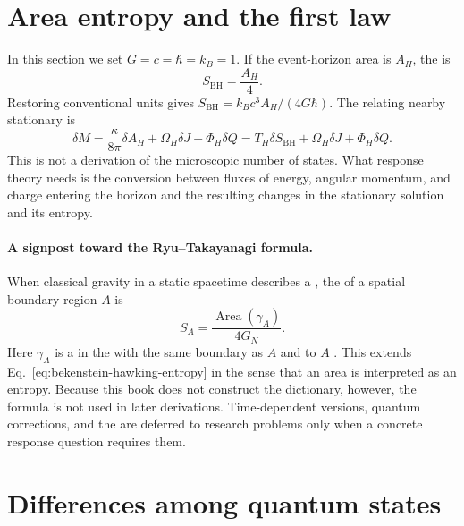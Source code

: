\section{Area entropy and the first law}

In this section we set $G=c=\hbar=k_B=1$. If the event-horizon area is $A_H$, the  is
\begin{equation}
S_{\mathrm{BH}}
=
\frac{A_H}{4}.
\label{eq:bekenstein-hawking-entropy}
\end{equation}
\cite{Bekenstein:1973ur,Hawking:1975vcx} Restoring conventional units gives $S_{\mathrm{BH}}=k_Bc^3A_H/(4G\hbar)$. The  relating nearby stationary  is
\begin{equation}
\delta M
=
\frac{\kappa}{8\pi}\delta A_H
+\Omega_H\delta J
+\Phi_H\delta Q
=
T_H\delta S_{\mathrm{BH}}
+\Omega_H\delta J
+\Phi_H\delta Q.
\label{eq:black-hole-first-law}
\end{equation}
\cite{Bardeen:1973gs} This is not a derivation of the microscopic number of states. What response theory needs is the conversion between fluxes of energy, angular momentum, and charge entering the horizon and the resulting changes in the stationary solution and its entropy.

\paragraph{A signpost toward the Ryu--Takayanagi formula.}
When classical gravity in a static  spacetime describes a , the  of a spatial boundary region $A$ is
\begin{equation}
S_A
=
\frac{\operatorname{Area}(\gamma_A)}{4G_N}.
\label{eq:ryu-takayanagi-signpost}
\end{equation}
Here $\gamma_A$ is a  in the  with the same boundary as $A$ and  to $A$ \cite{Ryu:2006bv}. This extends Eq.~\eqref{eq:bekenstein-hawking-entropy} in the sense that an area is interpreted as an entropy. Because this book does not construct the  dictionary, however, the formula is not used in later derivations. Time-dependent versions, quantum corrections, and the  are deferred to research problems only when a concrete response question requires them.

\section{Differences among quantum states}


